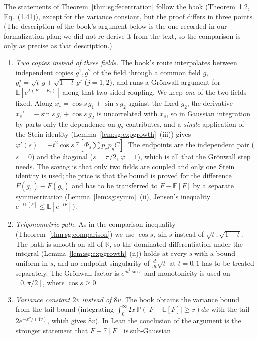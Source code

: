 \begin{remark}\label{rem:sg:deviation}
The statements of Theorem~\ref{thm:sg:fecentration} follow the book (Theorem~1.2, Eq.~(1.41)), except for the variance constant, but the proof
differs in three points. (The description of the book's argument below is the one recorded in our formalization plan; we did not re-derive it
from the text, so the comparison is only as precise as that description.)
\begin{enumerate}
\item \emph{Two copies instead of three fields.} The book's route interpolates between independent copies $g^1,g^2$ of the field through a common field $g$,
$g^j_t=\sqrt t\,g+\sqrt{1-t}\,g^j$ ($j=1,2$), and runs a Gr\"onwall argument for $\mathbb E[e^{\lambda(F_1-F_2)}]$ along that two-sided coupling. We keep
\emph{one} of the two fields fixed. Along $x_s=\cos s\,g_1+\sin s\,g_2$ against the fixed $g_2$, the derivative $x_s'=-\sin s\,g_1+\cos s\,g_2$ is uncorrelated with
$x_s$, so in Gaussian integration by parts only the dependence on $g_2$ contributes, and a \emph{single} application of the Stein identity
(Lemma~\ref{lem:sg:expgrowth}~(iii)) gives $\varphi'(s)=-t^2\cos s\,\mathbb E[\Phi_s\sum p_x p_y C]$. The endpoints are the independent pair
($s=0$) and the diagonal ($s=\pi/2$, $\varphi=1$), which is all that the Gr\"onwall step needs. The saving is that only two fields are coupled and only one Stein identity is used; the price is that the bound is proved for the difference $F(g_1)-F(g_2)$ and has to be
transferred to $F-\mathbb E[F]$ by a separate symmetrization (Lemma~\ref{lem:sg:symm}~(ii), Jensen's inequality $e^{-t\mathbb E[F]}\le\mathbb E[e^{-tF}]$).
\item \emph{Trigonometric path.} As in the comparison inequality (Theorem~\ref{thm:sg:comparison}) we use $\cos s,\sin s$ instead of $\sqrt t,\sqrt{1-t}$.
The path is smooth on all of $\mathbb R$, so the dominated differentiation under the integral
(Lemma~\ref{lem:sg:expgrowth}~(ii)) holds at every $s$ with a bound uniform in $s$, and no endpoint singularity of $\frac{d}{dt}\sqrt t$ at $t=0,1$ has to be
treated separately. The Gr\"onwall factor is $e^{at^2\sin s}$ and monotonicity is used on $[0,\pi/2]$, where $\cos s\ge0$.
\item \emph{Variance constant $2v$ instead of $8v$.} The book obtains the variance bound from the tail bound (integrating $\int_0^\infty 2x\,\mathbb P(|F-\mathbb E[F]|\ge x)dx$ with the
tail $2e^{-x^2/(4v)}$, which gives $8v$). In Lean the conclusion of the argument is the stronger statement that $F-\mathbb E[F]$ is sub-Gaussian

\end{enumerate}
\end{remark}
